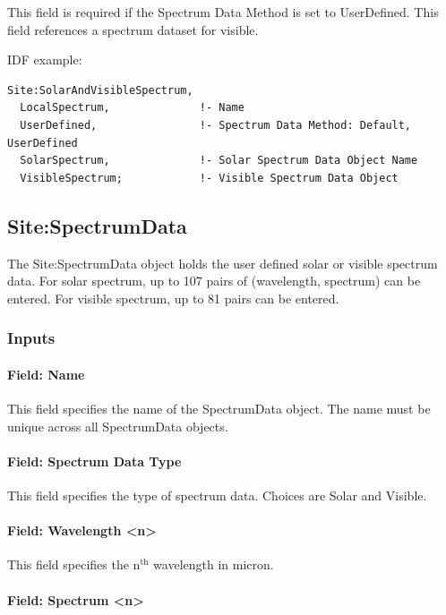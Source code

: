 This field is required if the Spectrum Data Method is set to UserDefined. This field references a spectrum dataset for visible.

IDF example:

\begin{lstlisting}
Site:SolarAndVisibleSpectrum,
  LocalSpectrum,              !- Name
  UserDefined,                !- Spectrum Data Method: Default, UserDefined
  SolarSpectrum,              !- Solar Spectrum Data Object Name
  VisibleSpectrum;            !- Visible Spectrum Data Object
\end{lstlisting}

\subsection{Site:SpectrumData}\label{sitespectrumdata}

The Site:SpectrumData object holds the user defined solar or visible spectrum data. For solar spectrum, up to 107 pairs of (wavelength, spectrum) can be entered. For visible spectrum, up to 81 pairs can be entered.

\subsubsection{Inputs}\label{inputs-25-001}

\paragraph{Field: Name}\label{field-name-11-007}

This field specifies the name of the SpectrumData object. The name must be unique across all SpectrumData objects.

\paragraph{Field: Spectrum Data Type}\label{field-spectrum-data-type}

This field specifies the type of spectrum data. Choices are Solar and Visible.

\paragraph{Field: Wavelength \textless{}n\textgreater{}}\label{field-wavelength-n}

This field specifies the n$^\textrm{th}$ wavelength in micron.

\paragraph{Field: Spectrum \textless{}n\textgreater{}}\label{field-spectrum-n}


